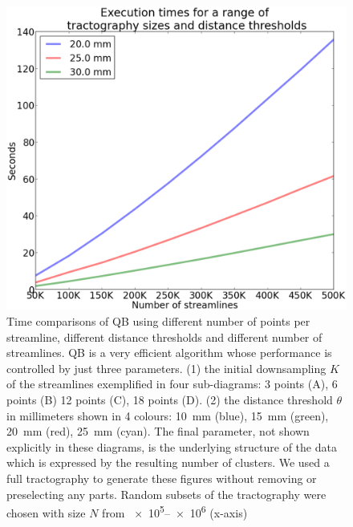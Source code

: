 \documentclass{bioinfo}
\begin{document}
\begin{figure}
\noindent \begin{centering}
\includegraphics[scale=0.3]{Figures/Fig_3_timings}
\par\end{centering}
\caption{Time comparisons of QB using different number of points per
  streamline, different distance thresholds and different number of
  streamlines. QB is a very efficient algorithm whose performance is
  controlled by just three parameters. (1) the initial downsampling $K$
  of the streamlines exemplified in four sub-diagrams: 3 points (A), 6
  points (B) 12 points (C), 18 points (D). (2) the distance threshold
  $\theta$ in millimeters shown in 4 colours: 10~mm (blue), 15~mm
  (green), 20~mm (red), 25~mm (cyan). The final parameter, not shown
  explicitly in these diagrams, is the underlying structure of the data
  which is expressed by the resulting number of clusters.  We used a
  full tractography to generate these figures without removing or
  preselecting any parts. Random subsets of the tractography were chosen
  with size $N$ from \numrange{e5}{e6} (x-axis)\label{Flo:Speed1}}
\end{figure}
\end{document}
